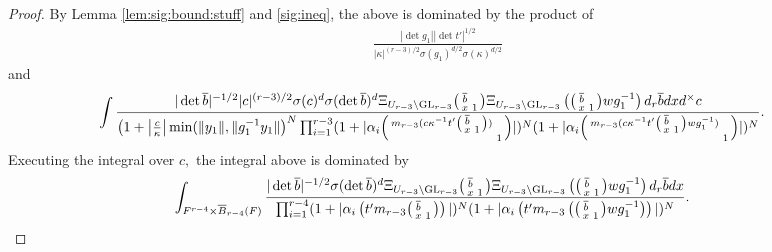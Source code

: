 \documentclass[12pt]{amsart}
\theoremstyle{remark}
\numberwithin{equation}{section}
\newcommand{\GL}{\mathrm{GL}}
\theoremstyle{definition}
\newenvironment{psmatrix}
  {\left(\begin{smallmatrix}}
  {\end{smallmatrix}\right)}
\numberwithin{equation}{subsection}
\newcommand{\norm}[1]{\lVert#1\rVert}
\begin{document}
\begin{proof}
By Lemma \ref{lem:sig:bound:stuff} and \eqref{sig:ineq}, the above is dominated by the product of  
\begin{align}\label{after:sig:lem1}
    \frac{|\det g_1||\det t'|^{1/2}}{|\kappa|^{(r-3)/2}\sigma(g_1)^{d/2}\sigma(\kappa)^{d/2}}
\end{align}
and 
\begin{align*}
\begin{split}
&\int\frac{|\det \overline{b}|^{-1/2}|c|^{(r-3)/2}\sigma(c)^{d}\sigma(\det \overline{b})^{d}\Xi_{U_{r-3} \backslash \GL_{r-3}}\begin{psmatrix} \overline{b} & \\ x & 1\end{psmatrix}\Xi_{U_{r-3} \backslash \GL_{r-3}}\left(\begin{psmatrix} \overline{b} & \\ x & 1 \end{psmatrix}wg_1^{-1}\right)d_r\overline{b}dxd^\times c}{\left(1+\left|\frac{c}{\kappa}\right|\min(\norm{y_1},\norm{g_1^{-1}y_1}\right)^{N}
  \prod_{i=1}^{r-3}(1+|\alpha_i\begin{psmatrix} m_{r-3}(c\kappa^{-1}t'\begin{psmatrix}\overline{b} & \\ x & 1 \end{psmatrix}) & \\ & 1 \end{psmatrix}|)^{N}(1+|\alpha_i\begin{psmatrix} m_{r-3}(c\kappa^{-1}t'\begin{psmatrix}\overline{b}& \\ x & 1 \end{psmatrix}wg_1^{-1}) & \\ & 1 \end{psmatrix}|)^{N}}.  
\end{split}
\end{align*}
Executing the integral over $c,$ the integral above is dominated by 
\begin{align*}
\begin{split}
& \int_{ F^{r-4}\times \overline{B}_{r-4}(F)} \frac{|\det \overline{b}|^{-1/2}\sigma(\det \overline{b})^{d}\Xi_{U_{r-3} \backslash \GL_{r-3}}\begin{psmatrix} \overline{b} & \\ x & 1\end{psmatrix}\Xi_{U_{r-3} \backslash \GL_{r-3}}\left(\begin{psmatrix} \overline{b} & \\ x & 1 \end{psmatrix}wg_1^{-1}\right)d_r\overline{b}dx}{
  \prod_{i=1}^{r-4}(1+|\alpha_i\left(t'm_{r-3}\begin{psmatrix}\overline{b} & \\ x & 1\end{psmatrix}\right)|)^{N}(1+|\alpha_i\left(t' m_{r-3}\left(\begin{psmatrix} \overline{b} & \\ x & 1 \end{psmatrix} wg_1^{-1}\right)\right) |)^{N}}.\end{split}
\end{align*}


\end{proof}
\end{document}
